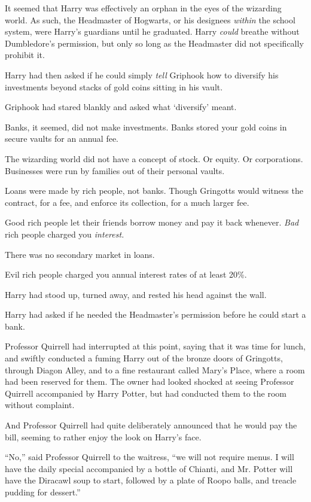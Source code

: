 It seemed that Harry was effectively an orphan in the eyes of the
wizarding world. As such, the Headmaster of Hogwarts, or his designees
\emph{within} the school system, were Harry's guardians until he
graduated. Harry \emph{could} breathe without Dumbledore's permission,
but only so long as the Headmaster did not specifically prohibit it.

Harry had then asked if he could simply \emph{tell} Griphook how to
diversify his investments beyond stacks of gold coins sitting in his
vault.

Griphook had stared blankly and asked what `diversify' meant.

Banks, it seemed, did not make investments. Banks stored your gold coins
in secure vaults for an annual fee.

The wizarding world did not have a concept of stock. Or equity. Or
corporations. Businesses were run by families out of their personal
vaults.

Loans were made by rich people, not banks. Though Gringotts would
witness the contract, for a fee, and enforce its collection, for a much
larger fee.

Good rich people let their friends borrow money and pay it back
whenever. \emph{Bad} rich people charged you \emph{interest.}

There was no secondary market in loans.

Evil rich people charged you annual interest rates of at least 20\%.

Harry had stood up, turned away, and rested his head against the wall.

Harry had asked if he needed the Headmaster's permission before he could
start a bank.

Professor Quirrell had interrupted at this point, saying that it was
time for lunch, and swiftly conducted a fuming Harry out of the bronze
doors of Gringotts, through Diagon Alley, and to a fine restaurant
called Mary's Place, where a room had been reserved for them. The owner
had looked shocked at seeing Professor Quirrell accompanied by Harry
Potter, but had conducted them to the room without complaint.

And Professor Quirrell had quite deliberately announced that he would
pay the bill, seeming to rather enjoy the look on Harry's face.

``No,'' said Professor Quirrell to the waitress, ``we will not require
menus. I will have the daily special accompanied by a bottle of Chianti,
and Mr. Potter will have the Diracawl soup to start, followed by a plate
of Roopo balls, and treacle pudding for dessert.''

